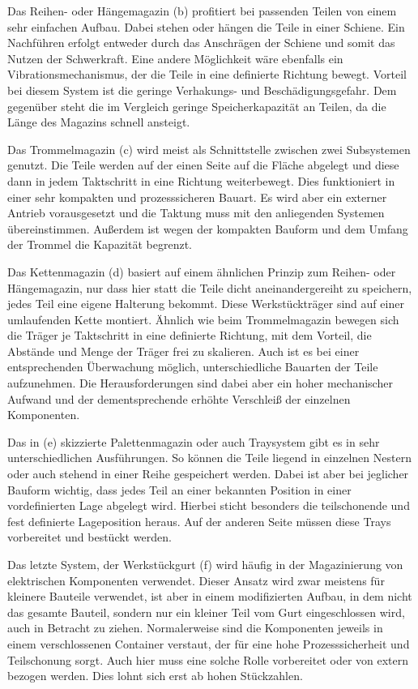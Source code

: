 Das Reihen- oder Hängemagazin (b) profitiert bei passenden Teilen von einem sehr einfachen Aufbau. Dabei stehen oder hängen
die Teile in einer Schiene. Ein Nachführen erfolgt entweder durch das Anschrägen der Schiene und somit das Nutzen der Schwerkraft.
Eine andere Möglichkeit wäre ebenfalls ein Vibrationsmechanismus, der die Teile in eine definierte Richtung bewegt.
Vorteil bei diesem System ist die geringe Verhakungs- und Beschädigungsgefahr. Dem gegenüber steht die im Vergleich geringe
Speicherkapazität an Teilen, da die Länge des Magazins schnell ansteigt.

Das Trommelmagazin (c) wird meist als Schnittstelle zwischen zwei Subsystemen genutzt. Die Teile werden auf der einen Seite
auf die Fläche abgelegt und diese dann in jedem Taktschritt in eine Richtung weiterbewegt. Dies funktioniert in einer sehr
kompakten und prozesssicheren Bauart. Es wird aber ein externer Antrieb vorausgesetzt und die Taktung muss mit den
anliegenden Systemen übereinstimmen. Außerdem ist wegen der kompakten Bauform und dem Umfang der Trommel die Kapazität
begrenzt.

Das Kettenmagazin (d) basiert auf einem ähnlichen Prinzip zum Reihen- oder Hängemagazin, nur dass hier statt die Teile
dicht aneinandergereiht zu speichern, jedes Teil eine eigene Halterung bekommt. Diese Werkstückträger sind auf einer
umlaufenden Kette montiert. Ähnlich wie beim Trommelmagazin bewegen sich die Träger je Taktschritt in eine definierte Richtung,
mit dem Vorteil, die Abstände und Menge der Träger frei zu skalieren. Auch ist es bei einer entsprechenden Überwachung möglich,
unterschiedliche Bauarten der Teile aufzunehmen. Die Herausforderungen sind dabei aber ein hoher mechanischer Aufwand und
der dementsprechende erhöhte Verschleiß der einzelnen Komponenten.

Das in (e) skizzierte Palettenmagazin oder auch Traysystem gibt es in sehr unterschiedlichen Ausführungen. So können
die Teile liegend in einzelnen Nestern oder auch stehend in einer Reihe gespeichert werden. Dabei ist aber bei jeglicher
Bauform wichtig, dass jedes Teil an einer bekannten Position in einer vordefinierten Lage abgelegt wird. Hierbei sticht besonders
die teilschonende und fest definierte Lageposition heraus. Auf der anderen Seite müssen diese Trays vorbereitet und bestückt
werden.

Das letzte System, der Werkstückgurt (f) wird häufig in der Magazinierung von elektrischen Komponenten verwendet. Dieser
Ansatz wird zwar meistens für kleinere Bauteile verwendet, ist aber in einem modifizierten Aufbau, in dem nicht das gesamte
Bauteil, sondern nur ein kleiner Teil vom Gurt eingeschlossen wird, auch in Betracht zu ziehen. Normalerweise sind die
Komponenten jeweils in einem verschlossenen Container verstaut, der für eine hohe Prozesssicherheit und Teilschonung sorgt.
Auch hier muss eine solche Rolle vorbereitet oder von extern bezogen werden. Dies lohnt sich erst ab hohen Stückzahlen.


